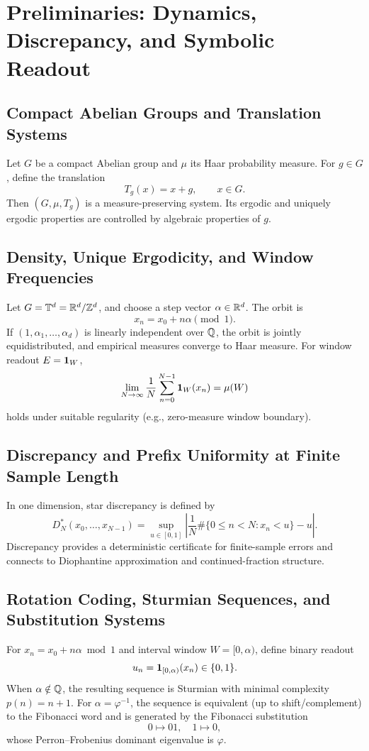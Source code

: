 ﻿\section{Preliminaries: Dynamics, Discrepancy, and Symbolic Readout}

\subsection{Compact Abelian Groups and Translation Systems}

Let $G$ be a compact Abelian group and $\mu$ its Haar probability measure. For $g\in G$, define the translation
\[
T_g(x)=x+g,\qquad x\in G.
\]
Then $(G,\mu,T_g)$ is a measure-preserving system. Its ergodic and uniquely ergodic properties are controlled by algebraic properties of $g$.

\subsection{Density, Unique Ergodicity, and Window Frequencies}

Let $G=\mathbb{T}^d=\mathbb{R}^d/\mathbb{Z}^d$, and choose a step vector $\alpha\in\mathbb{R}^d$. The orbit is
\[
x_n=x_0+n\alpha\pmod{1}.
\]
If $(1,\alpha_1,\dots,\alpha_d)$ is linearly independent over $\mathbb{Q}$, the orbit is jointly equidistributed, and empirical measures converge to Haar measure. For window readout $E=\mathbf{1}_W$,
\[
\lim_{N\to\infty}\frac{1}{N}\sum_{n=0}^{N-1}\mathbf{1}_W(x_n)=\mu(W)
\]
holds under suitable regularity (e.g., zero-measure window boundary).

\subsection{Discrepancy and Prefix Uniformity at Finite Sample Length}

In one dimension, star discrepancy is defined by
\[
D_N^*(x_0,\dots,x_{N-1})=\sup_{u\in[0,1]}\left|\frac{1}{N}\#\{0\le n<N:x_n<u\}-u\right|.
\]
Discrepancy provides a deterministic certificate for finite-sample errors and connects to Diophantine approximation and continued-fraction structure.

\subsection{Rotation Coding, Sturmian Sequences, and Substitution Systems}

For $x_n=x_0+n\alpha \bmod 1$ and interval window $W=[0,\alpha)$, define binary readout
\[
u_n=\mathbf{1}_{[0,\alpha)}(x_n)\in\{0,1\}.
\]
When $\alpha\notin\mathbb{Q}$, the resulting sequence is Sturmian with minimal complexity $p(n)=n+1$. For $\alpha=\varphi^{-1}$, the sequence is equivalent (up to shift/complement) to the Fibonacci word and is generated by the Fibonacci substitution
\[
0\mapsto 01,\quad 1\mapsto 0,
\]
whose Perron--Frobenius dominant eigenvalue is $\varphi$.

